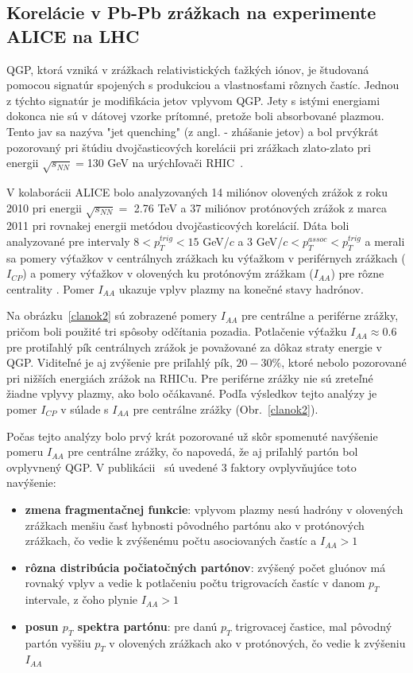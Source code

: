 \documentclass[thesismargins, thesislinespacing]{rnthesis}
\begin{document}
\subsection{Korelácie v Pb-Pb zrážkach na experimente  ALICE na LHC}
QGP, ktorá vzniká v zrážkach relativistických ťažkých iónov, je študovaná pomocou signatúr spojených s produkciou a vlastnosťami rôznych častíc. Jednou z týchto signatúr je modifikácia jetov vplyvom QGP. Jety s istými energiami dokonca nie sú v dátovej vzorke prítomné, pretože boli absorbované plazmou. Tento jav sa nazýva "jet quenching" (z angl. - zhášanie jetov) a bol prvýkrát pozorovaný pri štúdiu dvoj\-čas\-ti\-co\-vých korelácii pri zrážkach zlato-zlato pri energii $\sqrt{s_{NN}}=$130 GeV na urýchľovači RHIC~\cite{rhic}.

V kolaborácii ALICE bolo analyzovaných 14 miliónov olovených zrážok z roku 2010 pri energii $\sqrt{s_{NN}}=$ 2.76 TeV a 37 miliónov protónových zrážok z marca 2011 pri rovnakej energii metódou dvojčasticových korelácií. Dáta boli analyzované pre intervaly $8<p^{trig}_{T}<15$ GeV/$c$ a 3 GeV/$c<p^{assoc}_{T}<p_T^{trig}$ a merali sa pomery výťažkov v centrálnych zrážkach ku výťažkom v periférnych zrážkach ($I_{CP}$) a pomery výťažkov v olovených ku protónovým zrážkam ($I_{AA}$) pre rôzne centrality \cite{clanok}. Pomer $I_{AA}$ ukazuje vplyv plazmy na konečné stavy hadrónov. 

Na obrázku~\ref{clanok2} sú zobrazené pomery $I_{AA}$ pre centrálne a periférne zrážky, pričom boli použité tri spôsoby odčítania pozadia. Potlačenie výťažku $I_{AA}\approx0.6$ pre protiľahlý pík centrálnych zrážok je považované za dôkaz straty energie v QGP. Viditeľné je aj zvýšenie pre priľahlý pík, $20-30\%$, ktoré nebolo pozorované pri nižších energiách zrážok na RHICu. Pre periférne zrážky nie sú zreteľné žiadne vplyvy plazmy, ako bolo očákavané. Podľa výsledkov tejto analýzy je pomer $I_{CP}$ v súlade s $I_{AA}$ pre centrálne zrážky (Obr.~\ref{clanok2}).



Počas tejto analýzy bolo prvý krát pozorované už skôr spomenuté navýšenie pomeru $I_{AA}$ pre centrálne zrážky, čo napovedá, že aj priľahlý partón bol ovplyvnený QGP. V publikácii~\cite{clanok} sú uvedené 3 faktory ovplyvňujúce toto navýšenie:
\begin{itemize}
	\item \textbf{zmena fragmentačnej funkcie}: vplyvom plazmy nesú hadróny v olovených zrážkach menšiu časť hybnosti pôvodného partónu ako v protónových zrážkach, čo vedie k zvýšenému počtu asociovaných častíc a $I_{AA}>1$
	\item \textbf{rôzna distribúcia počiatočných partónov}: zvýšený počet gluónov má rovnaký vplyv a vedie k potlačeniu počtu trigrovacích častíc v danom $p_T$ intervale, z čoho plynie $I_{AA}>1$
	\item \textbf{posun $p_T$ spektra partónu}: pre danú $p_T$ trigrovacej častice, mal pôvodný partón vyššiu $p_T$ v olovených zrážkach ako v protónových, čo vedie k zvýšeniu $I_{AA}$
\end{itemize}
\end{document}
